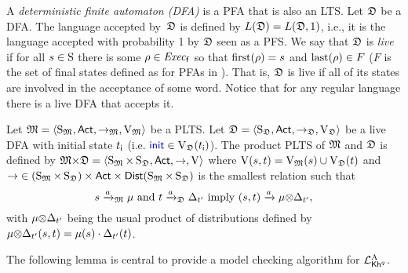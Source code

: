 A \emph{deterministic finite automaton (DFA)} is a PFA that is also an 
LTS. Let $\dfa$ be a DFA.  The language accepted by~$\dfa$ is defined
by $L(\dfa)=L(\dfa,1)$, i.e., it is the language accepted with
probability 1 by $\dfa$ seen as a PFS.
%
We say that $\dfa$ is \emph{live} if for all $s\in\S$ there is some
$\rho\in\execf$ so that $\first(\rho)=s$ and $\last(\rho)\in F$ ($F$
is the set of final states defined as for PFAs in
).  That is, $\dfa$ is live if all of its
states are involved in the acceptance of some word.  Notice that for
any regular language there is a live DFA that accepts it.

Let $\model=\tup{\S_\model,\Act,\ra_\model,\V_\model}$ be a PLTS.
%
Let $\dfa=\tup{\S_\dfa,\Act,\ra_\dfa,\V_\dfa}$ be a live DFA with
initial state $\tini$ (i.e. $\init\in\V_\dfa(\tini)$).  The product
PLTS of $\model$ and $\dfa$ is defined by
$\model{\times}\dfa=\tup{\S_\model{\times}\S_\dfa,\Act,\ra,\V}$
where $\V(s,t)=\V_\model(s)\cup\V_\dfa(t)$ and
${\ra}\in{(\S_\model{\times}\S_\dfa)}\times\Act\times\Dist({\S_\model{\times}\S_\dfa})$
is the smallest relation such that
%
\[s\reach{a}_\model\mu \text{ and } t\reach{a}_\dfa\Dirac_{t'} \text{ imply } (s,t)\reach{a}{\mu{\otimes}\Dirac_{t'}},\]
%
with $\mu{\otimes}\Dirac_{t'}$ being the usual product of distributions
defined by $\mu{\otimes}\Dirac_{t'}(s,t)= \mu(s)\cdot\Dirac_{t'}(t)$.


The following lemma is central to provide a model checking
algorithm for $\PKhadapt$.

